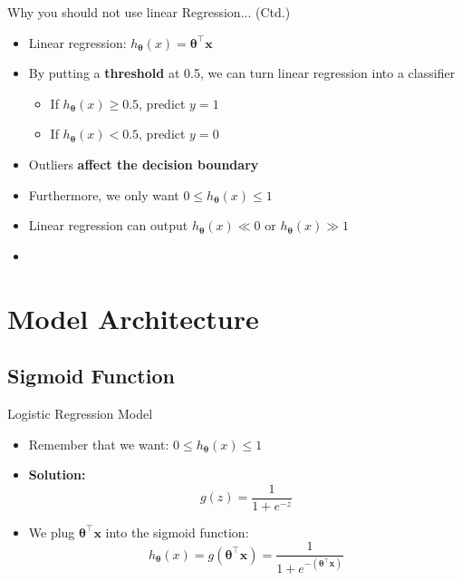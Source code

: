 \begin{frame}{Why you should not use linear Regression... (Ctd.)}{}
	\begin{itemize}
		\item Linear regression: $h_{\bm{\theta}}(x) = \bm{\theta}^{\intercal} \bm{x}$
		\item By putting a \textbf{threshold} at 0.5, we can turn linear regression into a classifier
		\begin{itemize}
			\item If $h_{\bm{\theta}}(x) \ge 0.5$, predict $y = 1$
			\item If $h_{\bm{\theta}}(x) < 0.5$, predict $y = 0$
		\end{itemize}
		\item Outliers \textbf{affect the decision boundary}
		\item Furthermore, we only want $0 \le h_{\bm{\theta}}(x) \le 1$
		\item Linear regression can output $h_{\bm{\theta}}(x) \ll 0$ or $h_{\bm{\theta}}(x) \gg 1$
		\item {}
	\end{itemize}
\end{frame}


\section{Model Architecture}

\subsection{Sigmoid Function}

\begin{frame}{Logistic Regression Model}{}\important
	\begin{itemize}
		\item Remember that we want: $0 \le h_{\bm{\theta}}(x) \le 1$
		\item \textbf{Solution:} 
		\begin{equation}
			g(z) = \frac{1}{1 + e^{-z}}
		\end{equation}
		\item We plug $\bm{\theta}^{\intercal} \bm{x}$ into the sigmoid function:
		\begin{equation}
			h_{\bm{\theta}}(x) = g(\bm{\theta}^{\intercal} \bm{x}) = \frac{1}{1 + e^{-(\bm{\theta}^{\intercal} \bm{x})}}
		\end{equation}
	\end{itemize}
\end{frame}


